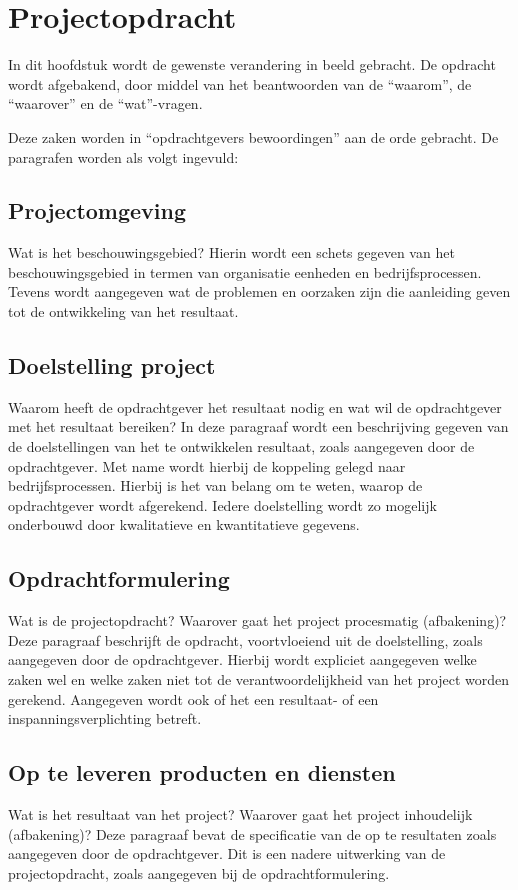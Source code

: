 \section{Projectopdracht}

In dit hoofdstuk wordt de gewenste verandering in beeld gebracht.
De opdracht wordt afgebakend, door middel van het beantwoorden van de ``waarom'', de ``waarover'' en de ``wat''-vragen.

Deze zaken worden in ``opdrachtgevers bewoordingen'' aan de orde gebracht.
De paragrafen worden als volgt ingevuld:

\subsection{Projectomgeving}
Wat is het beschouwingsgebied?
Hierin wordt een schets gegeven van het beschouwingsgebied in termen van organisatie eenheden en bedrijfsprocessen.
Tevens wordt aangegeven wat de problemen en oorzaken zijn die aanleiding geven tot de ontwikkeling van het resultaat.


\subsection{Doelstelling project}
Waarom heeft de opdrachtgever het resultaat nodig en wat wil de opdrachtgever met het resultaat bereiken?
In deze paragraaf wordt een beschrijving gegeven van de doelstellingen van het te ontwikkelen resultaat,
zoals aangegeven door de opdrachtgever.
Met name wordt hierbij de koppeling gelegd naar bedrijfsprocessen.
Hierbij is het van belang om te weten, waarop de opdrachtgever wordt afgerekend.
Iedere doelstelling wordt zo mogelijk onderbouwd door kwalitatieve en kwantitatieve gegevens.

\subsection{Opdrachtformulering}
Wat is de projectopdracht?
Waarover gaat het project procesmatig (afbakening)?
Deze paragraaf beschrijft de opdracht, voortvloeiend uit de doelstelling, zoals aangegeven door de opdrachtgever.
Hierbij wordt expliciet aangegeven welke zaken wel en welke zaken niet tot de verantwoordelijkheid van het project worden gerekend.
Aangegeven wordt ook of het een resultaat- of een inspanningsverplichting betreft.

\subsection{Op te leveren producten en diensten}
Wat is het resultaat van het project?
Waarover gaat het project inhoudelijk (afbakening)?
Deze paragraaf bevat de specificatie van de op te resultaten zoals aangegeven door de opdrachtgever.
Dit is een nadere uitwerking van de projectopdracht, zoals aangegeven bij de opdrachtformulering.

